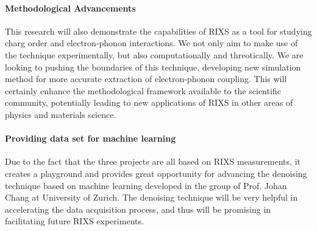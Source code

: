 \documentclass[11pt]{article}
\begin{document}
\paragraph{Methodological Advancements}
This research will also demonstrate the capabilities of RIXS as a tool for studying charg order and electron-phonon interactions. We not only aim to make use of the technique experimentally, but also computationally and threotically. We are looking to pushing the boundaries of this technique, developing new simulation method for more accurate extraction of electron-phonon coupling. This will certainly enhance the methodological framework available to the scientific community, potentially leading to new applications of RIXS in other areas of physics and materials science.

\paragraph{Providing data set for machine learning}
Due to the fact that the three projects are all based on RIXS measurements, it creates a playground and provides great opportunity for advancing the denoising technique based on machine learning developed in the group of Prof. Johan Chang at University of Zurich. The denoising technique will be very helpful in accelerating the data acquisition process, and thus will be promising in facilitating future RIXS experiments.





\end{document}
